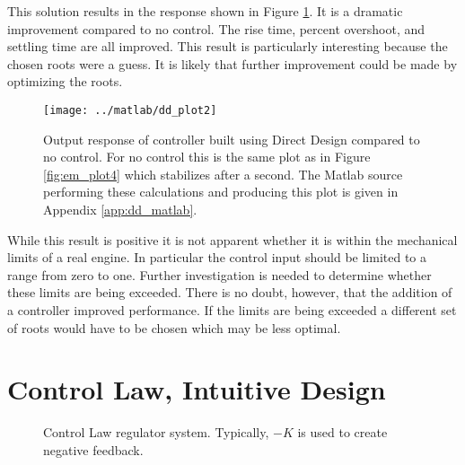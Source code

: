 \documentclass{article}
\begin{document}
This solution results in the response shown in Figure \ref{fig:dd_plot2}.
It is a dramatic improvement compared to no control.
The rise time, percent overshoot, and settling time are all improved.
This result is particularly interesting because the chosen roots were a guess.
It is likely that further improvement could be made by optimizing the roots.

\begin{figure}[htbp!]
\begin{center}
\texttt{[image: ../matlab/dd\_plot2]}
\end{center}
\caption{Output response of controller built using Direct Design
compared to no control.  For no control this is the same plot
as in Figure \ref{fig:em_plot4} which stabilizes after a second.
The Matlab source performing these calculations and producing this
plot is given in Appendix \ref{app:dd_matlab}.}
\label{fig:dd_plot2}
\end{figure}

While this result is positive it is not apparent whether it is within
the mechanical limits of a real engine.
In particular the control input should be limited to a range from zero to one.
Further investigation is needed to determine whether these limits
are being exceeded.
There is no doubt, however, that the addition of a controller
improved performance.
If the limits are being exceeded a different set of roots would have to
be chosen which may be less optimal.


\clearpage
\section{Control Law, Intuitive Design}
\label{sec:clid}

\begin{figure}[hpb!]
\begin{center}


\end{center}

\caption{Control Law regulator system.
Typically, $-K$ is used to create negative feedback.}
\label{fig:clid01}
\end{figure}
\end{document}
